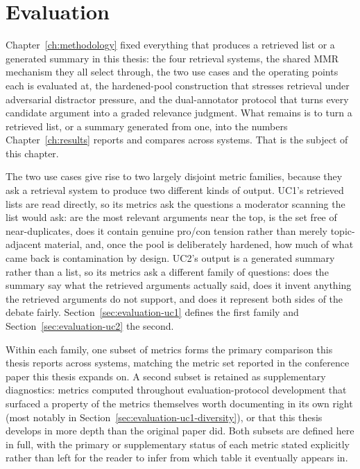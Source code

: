 \chapter{Evaluation}
\label{ch:evaluation}

Chapter~\ref{ch:methodology} fixed everything that produces a retrieved list or a generated
summary in this thesis: the four retrieval systems, the shared MMR mechanism they all select
through, the two use cases and the operating points each is evaluated at, the hardened-pool
construction that stresses retrieval under adversarial distractor pressure, and the dual-annotator
protocol that turns every candidate argument into a graded relevance judgment. What remains is to
turn a retrieved list, or a summary generated from one, into the numbers Chapter~\ref{ch:results}
reports and compares across systems. That is the subject of this chapter.

The two use cases give rise to two largely disjoint metric families, because they ask a retrieval
system to produce two different kinds of output. UC1's retrieved lists are read directly, so its
metrics ask the questions a moderator scanning the list would ask: are the most relevant arguments
near the top, is the set free of near-duplicates, does it contain genuine pro/con tension rather
than merely topic-adjacent material, and, once the pool is deliberately hardened, how much of what
came back is contamination by design. UC2's output is a generated summary rather than a list, so
its metrics ask a different family of questions: does the summary say what the retrieved arguments
actually said, does it invent anything the retrieved arguments do not support, and does it
represent both sides of the debate fairly. Section~\ref{sec:evaluation-uc1} defines the first
family and Section~\ref{sec:evaluation-uc2} the second.

Within each family, one subset of metrics forms the primary comparison this thesis reports across
systems, matching the metric set reported in the conference paper this thesis expands on. A second
subset is retained as supplementary diagnostics: metrics computed throughout evaluation-protocol
development that surfaced a property of the metrics themselves worth documenting in its own right
(most notably in Section~\ref{sec:evaluation-uc1-diversity}), or that this thesis develops in more
depth than the original paper did. Both subsets are defined here in full, with the primary or
supplementary status of each metric stated explicitly rather than left for the reader to infer from
which table it eventually appears in.

